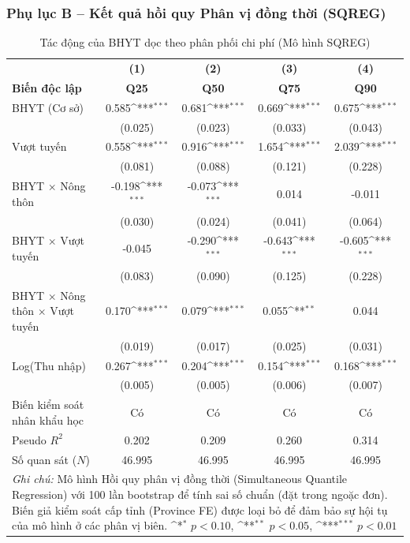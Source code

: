 \documentclass[12pt,a4paper]{article}
\begin{document}
\newpage
\subsubsection{Phụ lục B – Kết quả hồi quy Phân vị đồng thời (SQREG)}

\begin{table}[htbp]
	\centering
	\def\sym#1{\ifmmode^{#1}\else\(^{#1}\)\fi}
	\caption{Tác động của BHYT dọc theo phân phối chi phí (Mô hình SQREG)}
	\label{tab:sqreg_appendix}
	\begin{tabular}{lcccc}
		\toprule
		&\textbf{(1)}&\textbf{(2)}&\textbf{(3)}&\textbf{(4)}\\
		\textbf{Biến độc lập}&\textbf{Q25}&\textbf{Q50}&\textbf{Q75}&\textbf{Q90}\\
		\midrule
		BHYT (Cơ sở) & 0.585\sym{***} & 0.681\sym{***} & 0.669\sym{***} & 0.675\sym{***} \\
		& (0.025) & (0.023) & (0.033) & (0.043) \\
		\addlinespace
		Vượt tuyến & 0.558\sym{***} & 0.916\sym{***} & 1.654\sym{***} & 2.039\sym{***} \\
		& (0.081) & (0.088) & (0.121) & (0.228) \\
		\addlinespace
		BHYT $\times$ Nông thôn & -0.198\sym{***} & -0.073\sym{***} & 0.014 & -0.011 \\
		& (0.030) & (0.024) & (0.041) & (0.064) \\
		\addlinespace
		BHYT $\times$ Vượt tuyến & -0.045 & -0.290\sym{***} & -0.643\sym{***} & -0.605\sym{***} \\
		& (0.083) & (0.090) & (0.125) & (0.228) \\
		\addlinespace
		BHYT $\times$ Nông thôn $\times$ Vượt tuyến & 0.170\sym{***} & 0.079\sym{***} & 0.055\sym{**} & 0.044 \\
		& (0.019) & (0.017) & (0.025) & (0.031) \\
		\addlinespace
		Log(Thu nhập) & 0.267\sym{***} & 0.204\sym{***} & 0.154\sym{***} & 0.168\sym{***} \\
		& (0.005) & (0.005) & (0.006) & (0.007) \\
		\midrule
		Biến kiểm soát nhân khẩu học & Có & Có & Có & Có \\
		\midrule
		Pseudo $R^2$ & 0.202 & 0.209 & 0.260 & 0.314 \\
		Số quan sát ($N$) & 46.995 & 46.995 & 46.995 & 46.995 \\
		\bottomrule
		\multicolumn{5}{p{13.5cm}}{\footnotesize \textit{Ghi chú:} Mô hình Hồi quy phân vị đồng thời (Simultaneous Quantile Regression) với 100 lần bootstrap để tính sai số chuẩn (đặt trong ngoặc đơn). Biến giả kiểm soát cấp tỉnh (Province FE) được loại bỏ để đảm bảo sự hội tụ của mô hình ở các phân vị biên. \newline \sym{*} \(p<0.10\), \sym{**} \(p<0.05\), \sym{***} \(p<0.01\)}
	\end{tabular}
\end{table}
\end{document}

